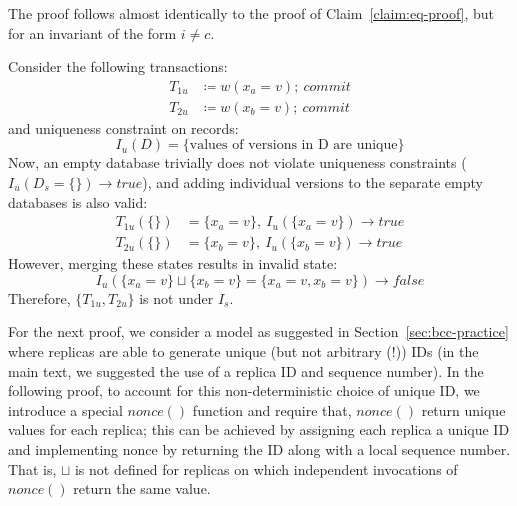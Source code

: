 \begin{claim} \label{claim:neq} The proof follows almost identically to the proof of Claim~\ref{claim:eq-proof}, but for an invariant of the form $i\neq c$.  \end{claim}

\begin{claim}
\label{claim:sunique}
Consider the following transactions:
\begin{align*}
T_{1u}&\coloneqq w(x_a=v);~commit\\
T_{2u}&\coloneqq w(x_b=v);~commit
\end{align*}
and uniqueness constraint on records:
$$I_u(D) = \{\textrm{values of versions in D are unique}\}$$
Now, an empty database trivially does not violate uniqueness constraints ($I_u(D_s=\{\})\rightarrow true$), and adding individual versions to the separate empty databases is also valid:
\begin{align*}
T_{1u}(\{\})&=\{x_a=v\},~I_u(\{x_a=v\}) \rightarrow true\\
T_{2u}(\{\})&=\{x_b=v\},~I_u(\{x_b=v\}) \rightarrow true
\end{align*}
However, merging these states results in invalid state:
$$I_u(\{x_a=v\}\sqcup \{x_b=v\} = \{x_a=v, x_b=v\}) \rightarrow false$$
Therefore, $\{T_{1u}, T_{2u}\}$ is not \iconfluent under $I_s$.
\end{claim} 

For the next proof, we consider a model as suggested in
Section~\ref{sec:bcc-practice} where replicas are able to generate
unique (but not arbitrary (!)) IDs (in the main text, we suggested the
use of a replica ID and sequence number). In the following proof, to
account for this non-deterministic choice of unique ID, we introduce a
special $nonce()$ function and require that, $nonce()$ return unique
values for each replica; this can be achieved by assigning each replica a
unique ID and implementing nonce by returning the ID along with a local sequence number. That is, $\sqcup$ is not defined for replicas
on which independent invocations of $nonce()$ return the same value.

